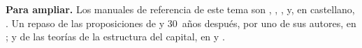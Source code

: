 \documentclass[11pt]{article}
\begin{document}
\begin{anotaciones}
\textbf{Para ampliar.} Los manuales de referencia de este tema son \textcite{Vernimmen2017Corporate}, \textcite{BrealeyMyersAllen2020Principles}, \textcite{Damodaran2015Applied}, \textcite{CopelandWestonShastri2014Financial} y, en castellano, \textcite{SuarezSuarez2014Decisiones}. Un repaso de las proposiciones de  y  30~años después, por uno de sus autores, en \textcite{Miller1988Propositions}; y de las teorías de la estructura del capital, en \textcite{HarrisRaviv1991Theory} y \textcite{Myers2001Capital}.
\end{anotaciones}

\bibliografia
\end{document}
